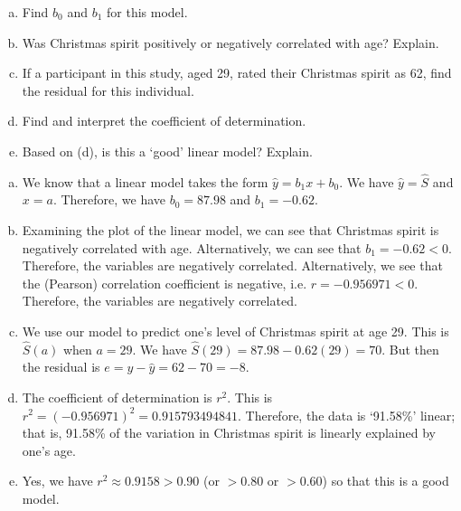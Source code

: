 \documentclass[12pt,letterpaper]{exam}
\begin{document}
\begin{questions}
\begin{enumerate}[(a)]
\item Find $b_0$ and $b_1$ for this model. 
\item Was Christmas spirit positively or negatively correlated with age? Explain.
\item If a participant in this study, aged 29, rated their Christmas spirit as 62, find the residual for this individual. 
\item Find and interpret the coefficient of determination. 
\item Based on (d), is this a `good' linear model? Explain. 
\end{enumerate} 

\sol 
\begin{enumerate}[(a)]
\item We know that a linear model takes the form $\widehat{y}= b_1x + b_0$. We have $\widehat{y}= \widehat{S}$ and $x= a$. Therefore, we have $b_0= 87.98$ and $b_1= -0.62$. \pspace

\item Examining the plot of the linear model, we can see that Christmas spirit is negatively correlated with age. Alternatively, we can see that $b_1= -0.62 < 0$. Therefore, the variables are negatively correlated. Alternatively, we see that the (Pearson) correlation coefficient is negative, i.e. $r= -0.956971 < 0$. Therefore, the variables are negatively correlated. \pspace

\item We use our model to predict one's level of Christmas spirit at age 29. This is $\widehat{S}(a)$ when $a= 29$. We have $\widehat{S}(29)= 87.98 - 0.62(29)= 70$. But then the residual is $e= y - \widehat{y}= 62 - 70= -8$. \pspace

\item The coefficient of determination is $r^2$. This is $r^2= (-0.956971)^2= 0.915793494841$. Therefore, the data is `91.58\%' linear; that is, 91.58\% of the variation in Christmas spirit is linearly explained by one's age. \pspace

\item Yes, we have $r^2 \approx 0.9158 > 0.90$ (or $> 0.80$ or $> 0.60$) so that this is a good model. 
\end{enumerate}
	

\end{questions}
\end{document}
